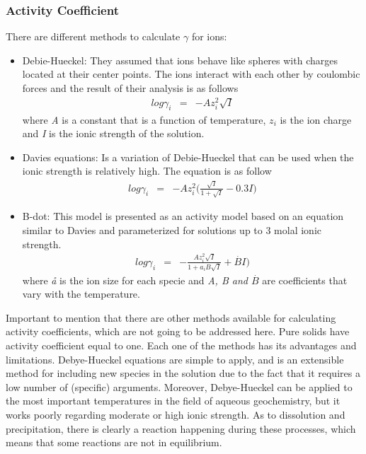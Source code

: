 \documentclass[ppgc,mestrado,English]{iiufrgs}
\begin{document}
\subsubsection{Activity Coefficient} 
There are different methods to calculate $\gamma$ for ions:
\begin{itemize}
\item Debie-Hueckel: They assumed that ions behave like spheres with charges located at their center points. The ions interact with each other by coulombic forces and the result of their analysis is as follows
\begin{eqnarray} \label{eq:debyeEq}
log \gamma_i &=& - Az_i^2\sqrt{I}
\end{eqnarray} 
where \emph{A} is a constant that is a function of temperature, \emph{$z_i$} is the ion charge and \emph{I} is the ionic strength of the solution.
\item Davies equations: Is a variation of Debie-Hueckel that can be used when the ionic strength is relatively high. The equation is as follow
\begin{eqnarray} \label{eq:daviesEq}
log \gamma_i &=& - Az_i^2 \bigg(\frac{\sqrt{I}}{1+\sqrt{I}} - 0.3 I)
\end{eqnarray}
\item B-dot: This model is presented as an activity model based on an equation similar to Davies and parameterized for solutions up to 3 molal ionic strength.
\begin{eqnarray} \label{eq:bdotEq}
log \gamma_i &=& - \frac{Az_i^2 \sqrt{I}}{1+ a_i B \sqrt{I}} + \overset{.}{B} I )
\end{eqnarray}
where \emph{\aa}  is the ion size for each specie and \emph{A, B and $\overset{.}{B}$} are coefficients that vary with the temperature.
\end{itemize}
Important to mention that there are other methods available for calculating activity coefficients, which are not going to be addressed here. Pure solids have activity coefficient equal to one. Each one of the methods has its advantages and limitations. Debye-Hueckel equations are simple to apply, and is an extensible method for including new species in the solution due to the fact that it requires a low number of (specific) arguments. Moreover, Debye-Hueckel can be applied to the most important temperatures in the field of aqueous geochemistry, but it works poorly regarding moderate or high ionic strength.
As to dissolution and precipitation, there is clearly a reaction happening during these processes, which means that some reactions are not in equilibrium.
\end{document}
